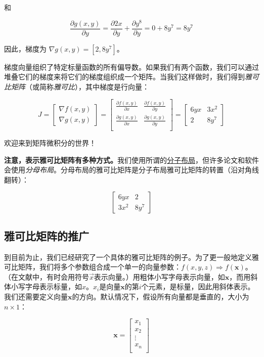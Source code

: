 \documentclass[11pt]{article}
\begin{document}
和

\[
\frac{\partial g(x,y)}{\partial y} = \frac{\partial 2x}{\partial y} + \frac{\partial y^8}{\partial y} = 0 + 8y^7 = 8y^7
\]

因此，梯度为 $\nabla g(x,y) = [2, 8y^7]$。

梯度向量组织了特定标量函数的所有偏导数。如果我们有两个函数，我们可以通过堆叠它们的梯度来将它们的梯度组织成一个矩阵。当我们这样做时，我们得到{\em 雅可比矩阵}（或简称{\em 雅可比}），其中梯度是行向量：

\[
J =
\begin{bmatrix}
	\nabla f(x,y)\\
	\nabla g(x,y)
\end{bmatrix} = \begin{bmatrix}
 \frac{\partial f(x,y)}{\partial x} & \frac{\partial f(x,y)}{\partial y}\\
 \frac{\partial g(x,y)}{\partial x} & \frac{\partial g(x,y)}{\partial y}\\
\end{bmatrix} = \begin{bmatrix}
	6yx & 3x^2\\
	2 & 8y^7
\end{bmatrix}
\]

欢迎来到矩阵微积分的世界！

{\bf 注意，表示雅可比矩阵有多种方式。}我们使用所谓的\href{https://en.wikipedia.org/wiki/Matrix_calculus\#Layout_conventions}{分子布局}，但许多论文和软件会使用{\em 分母布局}。分母布局的雅可比矩阵是分子布局雅可比矩阵的转置（沿对角线翻转）：

\[
\begin{bmatrix}
	6yx & 2\\
	3x^2 & 8y^7
\end{bmatrix}
\]

\subsection{雅可比矩阵的推广}\label{sec4.1}

到目前为止，我们已经研究了一个具体的雅可比矩阵的例子。为了更一般地定义雅可比矩阵，我们将多个参数组合成一个单一的向量参数：$f(x, y, z) \Rightarrow f(\mathbf{x})$。（在文献中，有时会用符号$\vec{x}$表示向量。）用粗体小写字母表示向量，如$\mathbf{x}$，而用斜体小写字母表示标量，如$x$。$x_i$是向量$\mathbf{x}$的第$i$个元素，是标量，因此用斜体表示。我们还需要定义向量$\mathbf{x}$的方向。默认情况下，假设所有向量都是垂直的，大小为$n \times 1$：

\[
\mathbf{x} = \begin{bmatrix}
           x_1\\
           x_2\\
           \vdots \\
           x_n\\
           \end{bmatrix}
\]
\end{document}
